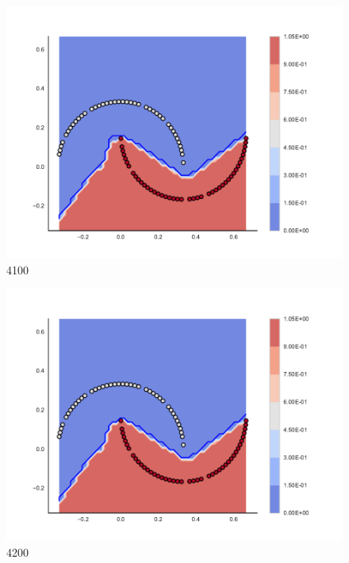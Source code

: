 \begin{subfigure}[b]{0.09\textwidth}
    \includegraphics[clip, trim=2.35cm 1.75cm 4.5cm 0cm,width=\textwidth]{img/convergence/4100.pdf}
    \caption{4100}
    \label{fig:convergence_4100}
\end{subfigure}
%
\begin{subfigure}[b]{0.09\textwidth}
    \includegraphics[clip, trim=2.35cm 1.75cm 4.5cm 0cm,width=\textwidth]{img/convergence/4200.pdf}
    \caption{4200}
    \label{fig:convergence_4200}
\end{subfigure}
%
